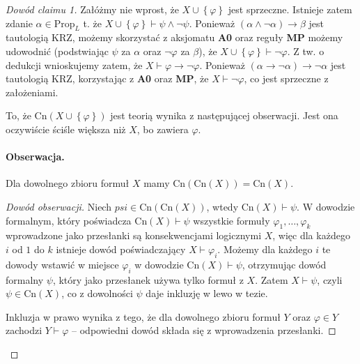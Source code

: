 \begin{proof}[Dowód claimu 1]
Załóżmy nie wprost, że \( X \cup \left\{ \varphi \right\} \) jest sprzeczne. Istnieje zatem zdanie \( \alpha \in \mathrm{Prop}_L \) t. że \( X \cup \left\{ \varphi \right\} \vdash \psi \wedge \neg \psi \). Ponieważ \( (\alpha \wedge \neg \alpha) \to \beta \) jest tautologią KRZ, możemy skorzystać z aksjomatu \textbf{A0} oraz reguły \textbf{MP} możemy udowodnić (podstwiając \( \psi \) za \( \alpha \) oraz \( \neg\varphi \) za \( \beta \)), że \( X \cup \left\{ \varphi \right\} \vdash \neg\varphi\). Z tw. o dedukcji wnioskujemy zatem, że \( X \vdash \varphi \to \neg\varphi \). Ponieważ \( (\alpha \to \neg\alpha) \to \neg\alpha \) jest tautologią KRZ, korzystając z \textbf{A0} oraz \textbf{MP}, że \( X \vdash \neg\varphi \), co jest sprzeczne z założeniami. 

To, że \( \mathrm{Cn}(X \cup \left\{ \varphi \right\}) \) jest teorią wynika z następującej obserwacji. Jest ona oczywiście ściśle większa niż \( X \), bo zawiera \( \varphi \).

\paragraph{Obserwacja.} Dla dowolnego zbioru formuł \( X \) mamy \( \mathrm{Cn}( \mathrm{Cn}(X) ) = \mathrm{Cn}(X) \).

\begin{proof}[Dowód obserwacji]

    Niech \( psi \in  \mathrm{Cn}( \mathrm{Cn}(X) ) \), wtedy \( \mathrm{Cn}(X) \vdash \psi \). W dowodzie formalnym, który poświadcza \( \mathrm{Cn}(X) \vdash \psi \) wszystkie formuły \( \varphi_1, \ldots, \varphi_k \) wprowadzone jako przesłanki są konsekwencjami logicznymi \( X \), więc dla każdego \( i  \) od \( 1 \) do \( k \) istnieje dowód poświadczający \( X \vdash \varphi_i \). Możemy dla każdego \( i \) te dowody wstawić w miejsce \( \varphi_i \) w dowodzie \( \mathrm{Cn}(X) \vdash \psi \), otrzymując dowód formalny \( \psi \), który jako przesłanek używa tylko formuł z \( X \). Zatem \( X \vdash \psi \), czyli \( \psi \in \mathrm{Cn}(X) \), co z dowolności \( \psi \) daje inkluzję w lewo w tezie. 

    Inkluzja w prawo wynika z tego, że dla dowolnego zbioru formuł \( Y \) oraz \( \varphi \in Y \) zachodzi \( Y \vdash \varphi \) -- odpowiedni dowód składa się z wprowadzenia przesłanki.
    
\end{proof}


\end{proof}


